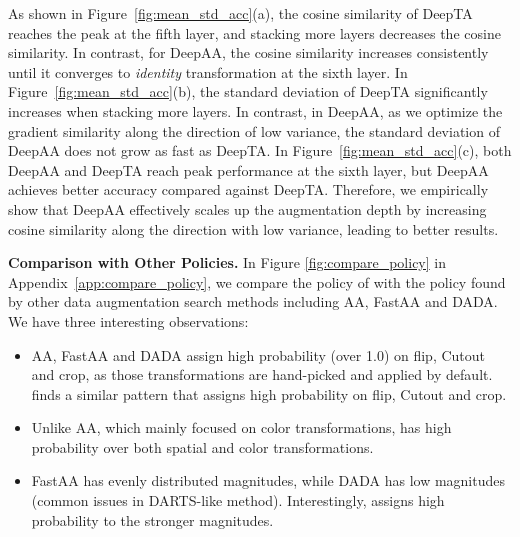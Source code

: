 As shown in Figure~\ref{fig:mean_std_acc}(a), the cosine similarity of DeepTA reaches the peak at the fifth layer, and stacking more layers decreases the cosine similarity. In contrast, for DeepAA, the cosine similarity increases consistently until it converges to \textit{identity} transformation at the sixth layer. 
In Figure~\ref{fig:mean_std_acc}(b), the standard deviation of DeepTA significantly increases when stacking more layers. In contrast, in DeepAA, as we optimize the gradient similarity along the direction of low variance, the standard deviation of DeepAA does not grow as fast as DeepTA. In Figure~\ref{fig:mean_std_acc}(c), both DeepAA and DeepTA reach peak performance at the sixth layer, but DeepAA achieves better accuracy compared against DeepTA. Therefore, we empirically show that DeepAA effectively scales up the augmentation depth by increasing cosine similarity along the direction with low variance, leading to better results.


\vspace{0mm}

\textbf{Comparison with Other Policies.}
In Figure \ref{fig:compare_policy} in Appendix~\ref{app:compare_policy}, we compare the policy of \DAA{} with the policy found by other data augmentation search methods including AA, FastAA and DADA. We have three interesting observations:
\begin{itemize}
    \item AA, FastAA and DADA assign high probability (over 1.0) on flip, Cutout and crop, as those transformations are hand-picked and applied by default. \DAA{} finds a similar pattern that assigns high probability on flip, Cutout and crop.
    \item Unlike AA, which mainly focused on color transformations, \DAA{} has high probability over both spatial and color transformations.
    \item FastAA has evenly distributed magnitudes, while DADA has low magnitudes (common issues in DARTS-like method). Interestingly, \DAA{} assigns high probability to the stronger magnitudes.
\end{itemize}


